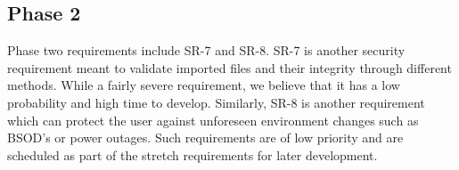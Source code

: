 \documentclass{article}
\begin{document}
\subsection{Phase 2}
Phase two requirements include SR-7 and SR-8. SR-7 is another security requirement meant to validate imported files and their integrity through different methods. While a fairly severe requirement, we believe that it has a low probability and high time to develop. Similarly, SR-8 is another requirement which can protect the user against unforeseen environment changes such as BSOD’s or power outages. Such requirements are of low priority and are scheduled as part of the stretch requirements for later development. 
\end{document}
